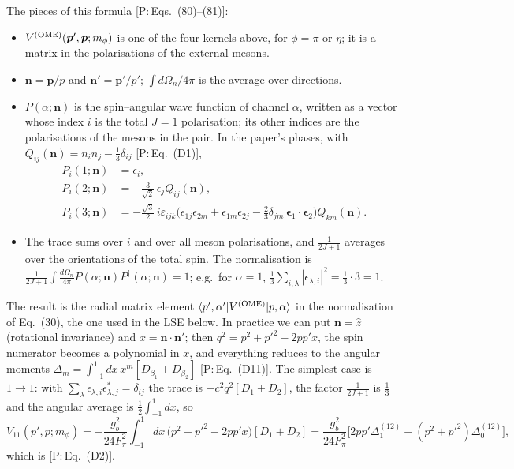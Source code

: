 \documentclass[11pt,a4paper]{article}
\newcommand{\tagP}[1]{\textcolor{blue!65!black}{\textsf{\small[P:\,#1]}}}
\newenvironment{aiadd}{\par}{\par}
\begin{document}
\begin{aiadd}
	The pieces of this formula \tagP{Eqs.~(80)--(81)}:
	\begin{itemize}
		\item $V^{(\rm OME)}(\bm p',\bm p;m_\phi)$ is one of the four kernels above, for $\phi=\pi$ or $\eta$; it is a matrix in the polarisations of the external mesons.
		\item $\bm n=\bm p/p$ and $\bm n'=\bm p'/p'$; $\int d\Omega_n/4\pi$ is the average over directions.
		\item $P(\alpha;\bm n)$ is the spin--angular wave function of channel $\alpha$, written as a vector whose index $i$ is the total $J=1$ polarisation; its other indices are the polarisations of the mesons in the pair. In the paper's phases, with $Q_{ij}(\bm n)=n_in_j-\frac13\delta_{ij}$ \tagP{Eq.~(D1)},
		      \begin{align*}
			      P_i(1;\bm n) & =\epsilon_i,                                                                                                                                                            \\
			      P_i(2;\bm n) & =-\frac{3}{\sqrt2}\,\epsilon_jQ_{ij}(\bm n),                                                                                                                            \\
			      P_i(3;\bm n) & =-\frac{\sqrt3}{2}\,i\varepsilon_{ijk}\Big(\epsilon_{1j}\epsilon_{2m}+\epsilon_{1m}\epsilon_{2j}-\frac23\delta_{jm}\,\bm\epsilon_1\cdot\bm\epsilon_2\Big)Q_{km}(\bm n).
		      \end{align*}
		\item The trace sums over $i$ and over all meson polarisations, and $\frac{1}{2J+1}$ averages over the orientations of the total spin. The normalisation is $\frac{1}{2J+1}\int\frac{d\Omega_n}{4\pi}P(\alpha;\bm n)P^\dagger(\alpha;\bm n)=1$; e.g.\ for $\alpha=1$, $\frac13\sum_{i,\lambda}|\epsilon_{\lambda,i}|^2=\frac13\cdot3=1$.
	\end{itemize}
	The result is the radial matrix element $\braket{p',\alpha'|V^{(\rm OME)}|p,\alpha}$ in the normalisation of Eq.~(30), the one used in the LSE below. In practice we can put $\bm n=\hat z$ (rotational invariance) and $x=\bm n\cdot\bm n'$; then $q^2=p^2+p'^2-2pp'x$, the spin numerator becomes a polynomial in $x$, and everything reduces to the angular moments $\Delta_m=\int_{-1}^1dx\,x^m[D_{\beta_1}+D_{\beta_2}]$ \tagP{Eq.~(D11)}. The simplest case is $1\to1$: with $\sum_\lambda\epsilon_{\lambda,i}\epsilon^*_{\lambda,j}=\delta_{ij}$ the trace is $-c^2q^2[D_1+D_2]$, the factor $\frac{1}{2J+1}$ is $\frac13$ and the angular average is $\frac12\int_{-1}^1dx$, so
	\[
		V_{11}(p',p;m_\phi)=-\frac{g_b^2}{24F_\pi^2}\int_{-1}^1dx\,\big(p^2+p'^2-2pp'x\big)[D_1+D_2]
		=\frac{g_b^2}{24F_\pi^2}\Big[2pp'\Delta^{(12)}_1-(p^2+p'^2)\Delta^{(12)}_0\Big],
	\]
	which is \tagP{Eq.~(D2)}.
\end{aiadd}
\end{document}
